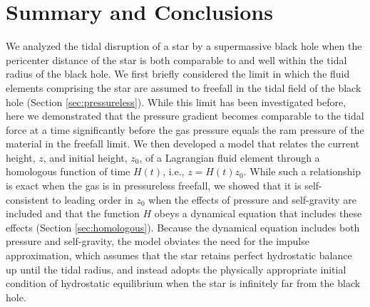 \documentclass[twocolumn]{aastex62}
\begin{document}
\section{Summary and Conclusions}
\label{sec:summary}
We analyzed the tidal disruption of a star by a supermassive black hole when the pericenter distance of the star is both comparable to and well within the tidal radius of the black hole. We first briefly considered the limit in which the fluid elements comprising the star are assumed to freefall in the tidal field of the black hole (Section \ref{sec:pressureless}). While this limit has been investigated before, here we demonstrated that the pressure gradient becomes comparable to the tidal force at a time significantly before the gas pressure equals the ram pressure of the material in the freefall limit. We then developed a model that relates the current height, $z$, and initial height, $z_0$, of a Lagrangian fluid element through a homologous function of time $H(t)$, i.e., $z = H(t) z_0$. While such a relationship is exact when the gas is in pressureless freefall, we showed that it is self-consistent to leading order in $z_0$ when the effects of pressure and self-gravity are included and that the function $H$ obeys a dynamical equation that includes these effects (Section \ref{sec:homologous}). Because the dynamical equation includes both pressure and self-gravity, the model obviates the need for the impulse approximation, which assumes that the star retains perfect hydrostatic balance up until the tidal radius, and instead adopts the physically appropriate initial condition of hydrostatic equilibrium when the star is infinitely far from the black hole. 
\end{document}
